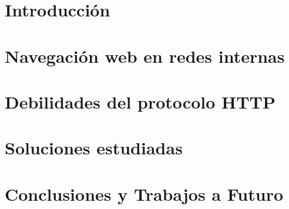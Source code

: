 \documentclass[12pt,twoside]{book}
\begin{document}
\nocite{*}

\frontmatter\pagestyle{empty}

\begin{titlepage}

\end{titlepage}





\tableofcontents

\mainmatter\pagestyle{headings}


\chapter{Introducción}
    \label{capIntro}



\chapter{Navegación web en redes internas} 
    \label{capImp}



\chapter{Debilidades del protocolo HTTP} 
    \label{capDesc}



\chapter{Soluciones estudiadas}
    \label{capVirtu}






\chapter{Conclusiones y Trabajos a Futuro}
    \label{capConc}



    



%




%
\end{document}
